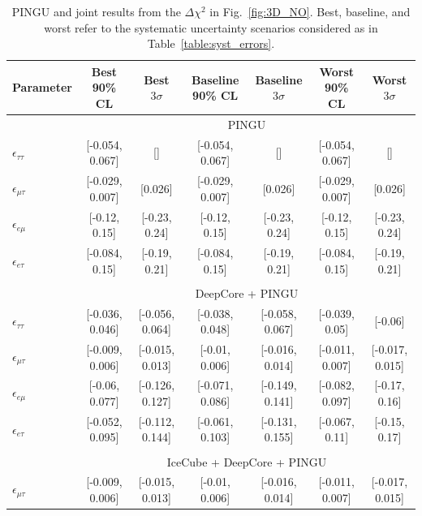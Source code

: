 \documentclass[draft=True]{revtex4-2}
\newcommand{\emt}{\ensuremath{\epsilon_{\mu\tau}}}
\newcommand{\eet}{\epsilon_{e\tau}}
\newcommand{\eem}{\epsilon_{e\mu}}
\newcommand{\ett}{\ensuremath{\epsilon_{\tau\tau}}}
\begin{document}
{{\begin{table}
\end{table}
\begin{table}
   \begin{tabular}{lcccccc}
      \hline \hline
      Parameter & Best 90\% CL & Best $3\sigma$& Baseline 90\% CL & Baseline $3\sigma$ & Worst 90\% CL & Worst $3\sigma$\\
      \hline & \multicolumn{6}{c}{PINGU} \\
      $\ett$ &  [-0.054, 0.067] &               [] &  [-0.054, 0.067] &               [] &  [-0.054, 0.067] &               [] \\
      $\emt$ &  [-0.029, 0.007] &          [0.026] &  [-0.029, 0.007] &          [0.026] &  [-0.029, 0.007] &          [0.026] \\
      $\eem$ &  [-0.12, 0.15] &  [-0.23, 0.24] &  [-0.12, 0.15] &  [-0.23, 0.24] &  [-0.12, 0.15] &  [-0.23, 0.24] \\
      $\eet$ &   [-0.084, 0.15] &  [-0.19, 0.21] &   [-0.084, 0.15] &  [-0.19, 0.21] &   [-0.084, 0.15] &  [-0.19, 0.21] \\\\
      & \multicolumn{6}{c}{DeepCore + PINGU} \\
      $\ett$ &  [-0.036, 0.046] &  [-0.056, 0.064] &  [-0.038, 0.048] &  [-0.058, 0.067] &   [-0.039, 0.05] &          [-0.06] \\
      $\emt$ &  [-0.009, 0.006] &  [-0.015, 0.013] &   [-0.01, 0.006] &  [-0.016, 0.014] &  [-0.011, 0.007] &  [-0.017, 0.015] \\
      $\eem$ &   [-0.06, 0.077] &  [-0.126, 0.127] &  [-0.071, 0.086] &  [-0.149, 0.141] &  [-0.082, 0.097] &  [-0.17, 0.16] \\
      $\eet$ &  [-0.052, 0.095] &  [-0.112, 0.144] &  [-0.061, 0.103] &  [-0.131, 0.155] &  [-0.067, 0.11] &  [-0.15, 0.17] \\\\
      & \multicolumn{6}{c}{IceCube + DeepCore + PINGU}  \\
      $\emt$ &  [-0.009, 0.006] &  [-0.015, 0.013] &   [-0.01, 0.006] &  [-0.016, 0.014] &  [-0.011, 0.007] &  [-0.017, 0.015] \\
      \hline
      \hline
   \end{tabular}
   \caption{PINGU and joint results from the $\Delta \chi^2$ in Fig.~\ref{fig:3D_NO}. Best, baseline, and worst refer to 
   the systematic uncertainty scenarios considered as in Table~\ref{table:syst_errors}.}\label{table:PINGU_joint_results}
\end{table}

}}
\end{document}
